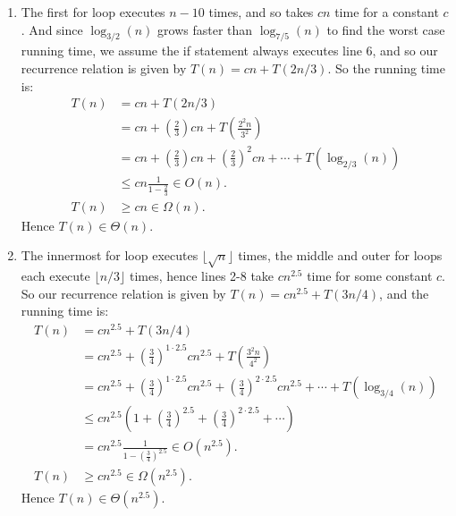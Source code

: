 \documentclass[10pt,oneside,reqno]{amsart}
\theoremstyle{plain}
\theoremstyle{definition}
\begin{document}
\begin{enumerate}[label=\arabic*.]
\item The first for loop executes $n - 10$ times, and so takes $cn$ time for a constant $c$. And since $\log_{3/2}(n)$ grows faster than $\log_{7/5}(n)$ to find the worst case running time, we assume the if statement always executes line 6, and so our recurrence relation is given by $T(n) = cn + T(2n/3)$. So the running time is:
\begin{equation}
\begin{aligned}
T(n) &= cn + T(2n/3)\\
&= cn + \left(\frac{2}{3} \right)cn + T\left(\frac{2^2n}{3^2} \right)\\
&= cn + \left(\frac{2}{3} \right)cn + \left(\frac{2}{3} \right)^2cn + \cdots + T\left(\log_{2/3}(n)\right)\\
&\leq cn \frac{1}{1 - \frac{2}{3}} \in O(n). \\
T(n) &\geq cn \in \Omega(n).
\end{aligned}
\end{equation}
Hence $T(n) \in \Theta(n)$. \\

\item The innermost for loop executes $\lfloor \sqrt{n} \rfloor$ times, the middle and outer for loops each execute $\lfloor n/3 \rfloor$ times, hence lines 2-8 take $cn^{2.5}$ time for some constant $c$. So our recurrence relation is given by $T(n) = cn^{2.5} + T(3n/4)$, and the running time is: 
\begin{equation}
\begin{aligned}
T(n) &= cn^{2.5} + T(3n/4)\\
&= cn^{2.5} + \left(\frac{3}{4} \right)^{1 \cdot 2.5}cn^{2.5} + T\left(\frac{3^2n}{4^2} \right)\\
&= cn^{2.5} + \left(\frac{3}{4} \right)^{1 \cdot 2.5}cn^{2.5} + \left(\frac{3}{4} \right)^{2 \cdot 2.5}cn^{2.5} + \cdots + T\left(\log_{3/4}(n)\right)\\
&\leqslant cn^{2.5} \left( 1 + \left(\frac{3}{4} \right)^{2.5} + \left(\frac{3}{4} \right)^{2 \cdot 2.5} + \cdots \right)\\
&= cn^{2.5} \frac{1}{1 -  \left(\frac{3}{4} \right)^{2.5}} \in O(n^{2.5}). \\
T(n) &\geqslant cn^{2.5} \in \Omega(n^{2.5}).
\end{aligned}
\end{equation}
Hence $T(n) \in \Theta(n^{2.5})$. \\


\end{enumerate}
\end{document}
